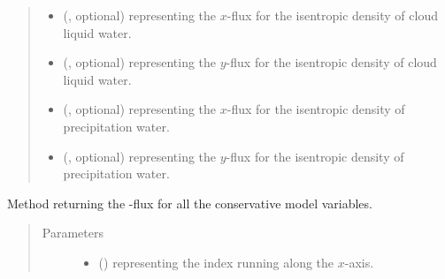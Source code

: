 \documentclass[letterpaper,10pt,english]{sphinxmanual}
\begin{document}
\begin{fulllineitems}
\begin{fulllineitems}
\begin{quote}
\begin{description}
\begin{itemize}
\item {} 
 (, optional) \textendash{}  representing the \(x\)-flux for the isentropic density of cloud liquid water.

\item {} 
 (, optional) \textendash{}  representing the \(y\)-flux for the isentropic density of cloud liquid water.

\item {} 
 (, optional) \textendash{}  representing the \(x\)-flux for the isentropic density of precipitation water.

\item {} 
 (, optional) \textendash{}  representing the \(y\)-flux for the isentropic density of precipitation water.

\end{itemize}


\end{description}\end{quote}

\end{fulllineitems}


\begin{fulllineitems}
\label{\detokenize{api:dycore.flux_isentropic.FluxIsentropic.get_vertical_fluxes}}
Method returning the -flux for all the conservative
model variables.
\begin{quote}\begin{description}
\item[{Parameters}] \leavevmode\begin{itemize}
\item {} 
 () \textendash{}  representing the index running along the \(x\)-axis.


\end{itemize}
\end{description}
\end{quote}
\end{fulllineitems}
\end{fulllineitems}
\end{document}
